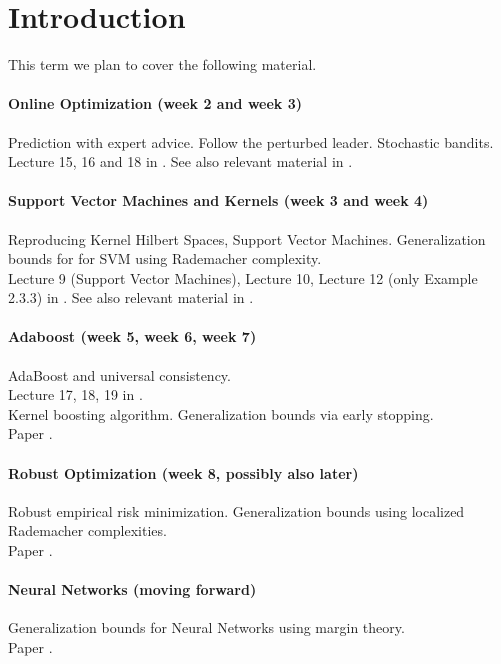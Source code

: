 
\chapter{Introduction}

This term we plan to cover the following material.

\subsubsection*{Online Optimization (week 2 and week 3)}
Prediction with expert advice. Follow the perturbed leader. Stochastic bandits.\\
Lecture 15, 16 and 18 in \cite{rigollet}. See also relevant material in \cite{barlett08}.

\subsubsection*{Support Vector Machines and Kernels (week 3 and week 4)}
Reproducing Kernel Hilbert Spaces, Support Vector Machines. Generalization bounds for for SVM using Rademacher complexity.\\
Lecture 9 (Support Vector Machines), Lecture 10, Lecture 12 (only Example 2.3.3) in \cite{rigollet}. See also relevant material in \cite{barlett08}.

\subsubsection*{Adaboost (week 5, week 6, week 7)}
AdaBoost and universal consistency.\\
Lecture 17, 18, 19 in \cite{barlett16}.\\

\noindent Kernel boosting algorithm. Generalization bounds via early stopping.\\
Paper \cite{wain17ada}.

\subsubsection*{Robust Optimization (week 8, possibly also later)}
Robust empirical risk minimization. Generalization bounds using localized Rademacher complexities.\\
Paper \cite{duchi17roubust}.

\subsubsection*{Neural Networks (moving forward)}
Generalization bounds for Neural Networks using margin theory.\\
Paper \cite{DBLP:journals/corr/BartlettFT17}.